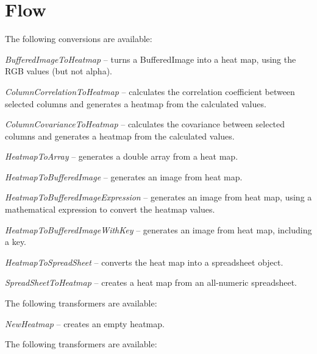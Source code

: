 \documentclass[a4paper]{book}
\begin{document}
\chapter{Flow}
The following conversions are available:
\begin{tight_itemize}
  	\item \textit{BufferedImageToHeatmap} -- turns a BufferedImage into a heat
  	map, using the RGB values (but not alpha).
  	\item \textit{ColumnCorrelationToHeatmap} -- calculates the correlation
  	coefficient between selected columns and generates a heatmap from the
  	calculated values.
  	\item \textit{ColumnCovarianceToHeatmap} -- calculates the covariance
  	between selected columns and generates a heatmap from the calculated values.
  	\item \textit{HeatmapToArray} -- generates a double array from a heat map.
  	\item \textit{HeatmapToBufferedImage} -- generates an image from heat map.
  	\item \textit{HeatmapToBufferedImageExpression} -- generates an image
  	from heat map, using a mathematical expression to convert the heatmap values.
  	\item \textit{HeatmapToBufferedImageWithKey} -- generates an image from heat
  	map, including a key.
  	\item \textit{HeatmapToSpreadSheet} -- converts the heat map into a
  	spreadsheet object.
  	\item \textit{SpreadSheetToHeatmap} -- creates a heat map from an all-numeric
  	spreadsheet.
\end{tight_itemize}
The following transformers are available:
\begin{tight_itemize}
  	\item \textit{NewHeatmap} -- creates an empty heatmap.
\end{tight_itemize}
The following transformers are available:
\end{document}
